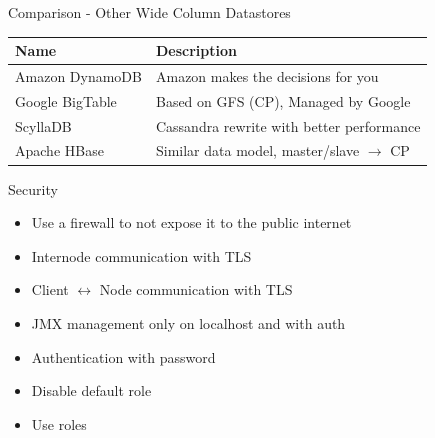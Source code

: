 \documentclass[
  10pt
]{beamer}
\begin{document}
\appendix

\begin{frame}{Comparison - Other Wide Column Datastores}
  \begin{center}
    \begin{tabular}{l|l}
      Name & Description \\
      \hline
      Amazon DynamoDB & Amazon makes the decisions for you \\
      Google BigTable & Based on GFS (CP), Managed by Google \\
      ScyllaDB & Cassandra rewrite with better performance \\
      Apache HBase & Similar data model, master/slave $\rightarrow$ CP\\
    \end{tabular}
  \end{center}
\end{frame}

\begin{frame}{Security}
  \begin{itemize}
    \item<1-> Use a firewall to not expose it to the public internet
    \item<2-> Internode communication with TLS
    \item<2-> Client $\leftrightarrow$ Node communication with TLS
    \item<3-> JMX management only on localhost and with auth
    \item<4-> Authentication with password
    \item<5-> Disable default role
    \item<5-> Use roles
  \end{itemize}
\end{frame}


\begin{frame}[allowframebreaks]
    \printbibliography
\end{frame}
\end{document}
